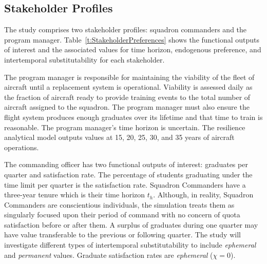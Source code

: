 \documentclass[preprint,12pt]{elsarticle}
\begin{document}
\subsection{Stakeholder Profiles}

The study comprises two stakeholder profiles: squadron
commanders and the program manager. Table~\ref{t:StakeholderPreferences}
shows the functional outputs of interest and the associated values for
time horizon, endogenous preference, and intertemporal
substitutability for each stakeholder.

The program manager is responsible for maintaining the
viability of the fleet of aircraft until a replacement system is
operational. Viability is assessed daily as the fraction of 
aircraft ready to provide training events to the total number of aircraft
assigned to the squadron. The program manager must also ensure the flight system
produces enough graduates over its lifetime and that time to train is
reasonable. The program manager's time horizon is uncertain. The
resilience analytical model outputs values at 15, 20, 25, 30, and 35
years of aircraft operations.  

The commanding officer has two functional outputs of interest:
graduates per quarter and satisfaction rate. The
percentage of students graduating under the time limit per quarter is
the satisfaction rate. Squadron Commanders have a three-year
tenure which is their time horizon $t_h$. Although, in reality,
Squadron Commanders are conscientious 
individuals, the simulation treats them as singularly focused upon
their period of command with no concern of quota satisfaction before
or after them. A surplus of graduates during one quarter may have value
transferable to the previous or following quarter. The study will
investigate different types of intertemporal substitutability to include
\emph{ephemeral} and \emph{permanent}
values. Graduate satisfaction rates are \emph{ephemeral} ($\chi = 0$).



\end{document}
